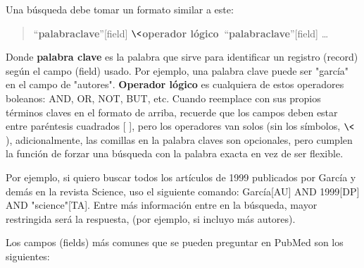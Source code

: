 \documentclass[letter,11pt]{book}
\begin{document}
 Una búsqueda debe tomar un formato similar a este:

\begin{quote}
``\textbf{palabraclave}''[field] $\<$\textbf{operador lógico} $\> $``\textbf{palabraclave}''[field] \ldots
\end{quote}

Donde \textbf{palabra clave} es la palabra que sirve para identificar un registro (record) según el campo (field) usado.  Por ejemplo, una palabra clave puede ser "garcía" en el campo de "autores". \textbf{Operador lógico} es cualquiera de estos operadores boleanos: AND, OR, NOT, BUT, etc.  Cuando reemplace con sus propios términos claves en el formato de arriba, recuerde que los campos deben estar entre paréntesis cuadrados [ ], pero los operadores van solos (sin los símbolos, $\<$  $\>$), adicionalmente, las comillas en la palabra claves son opcionales, pero cumplen la función de forzar una búsqueda con la palabra exacta en vez de ser flexible.

Por ejemplo, si quiero buscar todos los artículos de 1999 publicados por García y demás en la revista Science, uso el siguiente comando: García[AU] AND 1999[DP] AND "science"[TA].  Entre más información entre en la búsqueda, mayor restringida será la respuesta, (por ejemplo, si incluyo más autores).

Los campos (fields) más comunes que se pueden preguntar en PubMed son los siguientes:
\end{document}
